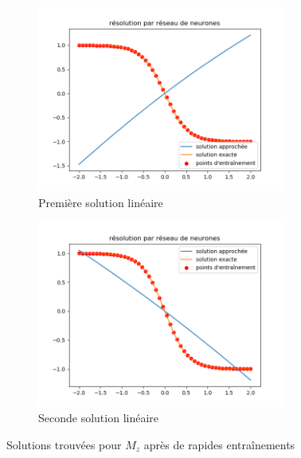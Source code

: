 \documentclass[12pt]{report}
\begin{document}
\begin{figure}
    \centering
    \begin{subfigure}[b]{0.4\textwidth}
        \centering
        \includegraphics[width=0.9\textwidth, height=0.9\textwidth]{min_loc1.png}
        \caption{Première solution linéaire}
    \end{subfigure}
    \hfill
    \begin{subfigure}[b]{0.4\textwidth}
        \centering
        \includegraphics[width=0.9\textwidth, height=0.9\textwidth]{min_loc2.png}
        \caption{Seconde solution linéaire}
    \end{subfigure}
    \caption{Solutions trouvées pour $M_z$ après de rapides entraînements}
    \label{fig:minima_locaux_Mz}
\end{figure}
\end{document}
